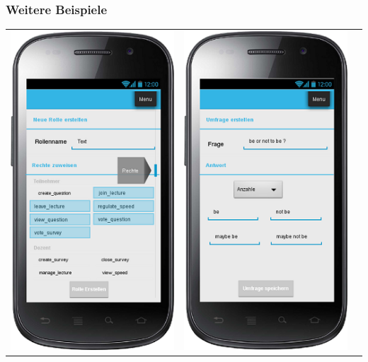 \documentclass[german,a4paper]{beamer}
\begin{document}
\begin{frame}
\frametitle{Weitere Beispiele}
\begin{tabular}{ccc}
  \includegraphics[height=0.75\textheight]{./mockups/mockup_rolle_erstellen.png}
  &
  \includegraphics[height=0.75\textheight]{./mockups/mockup_survey_create.png}

\end{tabular}
\end{frame}
\end{document}

